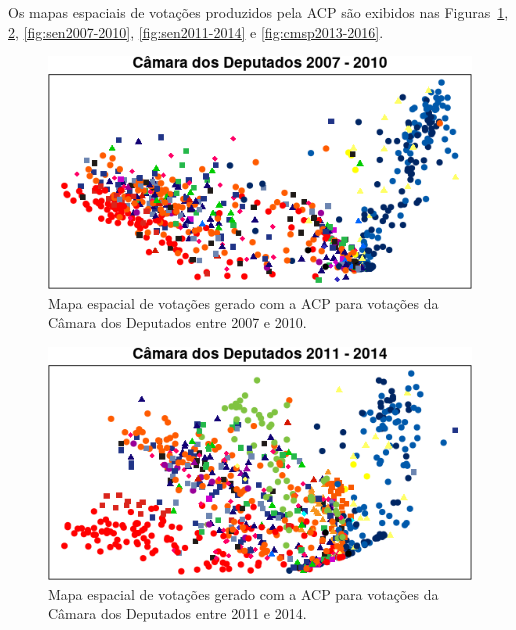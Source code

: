 \documentclass[
	article,			%
	12pt,				%
    twoside,			%
	a4paper,			%
	english,			%
	french,				%
	spanish,			%
	brazil,				%
	]{abntex2}
\begin{document}
Os mapas espaciais de votações produzidos pela ACP são exibidos nas Figuras~\ref{fig:cdep2007-2010}, \ref{fig:cdep2011-2014}, \ref{fig:sen2007-2010}, \ref{fig:sen2011-2014} e \ref{fig:cmsp2013-2016}.

\begin{figure}[h!]
  \centering
  \includegraphics[scale=0.9]{figs/cdep2007-2010.png}
  \caption{Mapa espacial de votações gerado com a ACP para votações da Câmara dos Deputados entre 2007 e 2010.}
  \label{fig:cdep2007-2010}
\end{figure}

\begin{figure}[h!]
  \centering
  \includegraphics[scale=0.9]{figs/cdep2011-2014.png}
  \caption{Mapa espacial de votações gerado com a ACP para votações da Câmara dos Deputados entre 2011 e 2014.}
  \label{fig:cdep2011-2014}
\end{figure}
\end{document}
